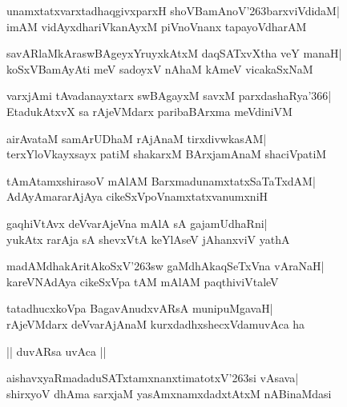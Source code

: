 \documentclass[twoside,12pt,openright]{book}
\def\S{\char'263}
\newcounter{shloka}[chapter]
\begin{document}
\begin{shloka}%
unamxtatxvarxtadhaqgivxparxH shoVBamAnoV\S barxviVdidaM|\\
imAM vidAyxdhariVkanAyxM piVnoVnanx tapayoVdharAM
\end{shloka}

\begin{shloka}%
savARlaMkAraswBAgeyxYruyxkAtxM daqSATxvXtha veY manaH|\\
koSxVBamAyAti meV sadoyxV nAhaM kAmeV vicakaSxNaM
\end{shloka}

\begin{shloka}%
varxjAmi tAvadanayxtarx swBAgayxM savxM parxdashaRya\char'366|\\
EtadukAtxvX sa rAjeVMdarx paribaBArxma meVdiniVM
\end{shloka}

\begin{shloka}%
airAvataM samArUDhaM rAjAnaM tirxdivwkasAM|\\
terxYloVkayxsayx patiM shakarxM BArxjamAnaM shaciVpatiM
\end{shloka}

\begin{shloka}%
tAmAtamxshirasoV mAlAM BarxmadunamxtatxSaTaTxdAM|\\
AdAyAmararAjAya cikeSxVpoVnamxtatxvanumxniH
\end{shloka}

\begin{shloka}%
gaqhiVtAvx deVvarAjeVna mAlA sA gajamUdhaRni|\\
yukAtx rarAja sA shevxVtA keYlAseV jAhanxviV yathA
\end{shloka}

\begin{shloka}%
madAMdhakAritAkoSxV\S sw gaMdhAkaqSeTxVna vAraNaH|\\
kareVNAdAya cikeSxVpa tAM mAlAM paqthiviVtaleV
\end{shloka}

\begin{shloka}%
tatadhucxkoVpa BagavAnudxvARsA munipuMgavaH|\\
rAjeVMdarx deVvarAjAnaM kurxdadhxshecxVdamuvAca ha
\end{shloka}

\begin{center}
|| duvARsa uvAca ||
\end{center}
\begin{shloka}%
aishavxyaRmadaduSATxtamxnanxtimatotxV\S si vAsava|\\
shirxyoV dhAma sarxjaM yasAmxnamxdadxtAtxM nABinaMdasi
\end{shloka}
\end{document}
